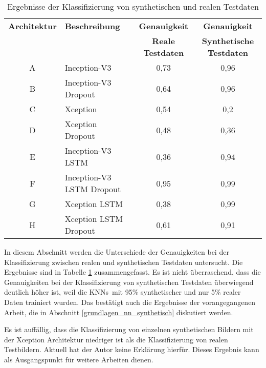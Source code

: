 \begin{table}[h]
\small
\centering
\def\arraystretch{1.4}
\begin{tabular}{c p{3cm} c c}
\textbf{Architektur} & \textbf{Beschreibung} & \textbf{Genauigkeit} & \textbf{Genauigkeit} \\
 & & \textbf{Reale Testdaten} & \textbf{Synthetische Testdaten} \\
\hline
A & Inception-V3 & 0,73 & 0,96 \\
\hline
B & Inception-V3 \newline Dropout & 0,64 & 0,96 \\
\hline
C & Xception & 0,54 & 0,2 \\
\hline
D & Xception \newline Dropout & 0,48 & 0,36 \\
\hline 
E & Inception-V3 \newline LSTM & 0,36 & 0,94 \\
\hline
F & Inception-V3 \newline LSTM \newline Dropout & 0,95 & 0,99 \\
\hline
G & Xception \newline LSTM & 0,38 & 0,99 \\
\hline
H & Xception \newline LSTM \newline Dropout & 0,61 & 0,91 \\
\hline
\end{tabular}
\caption{Ergebnisse der Klassifizierung von synthetischen und realen Testdaten}
\label{tab_ergebnis_synth}
\end{table}

In diesem Abschnitt werden die Unterschiede der Genauigkeiten bei der Klassifizierung zwischen realen und synthetischen Testdaten untersucht. Die Ergebnisse sind in Tabelle \ref{tab_ergebnis_synth} zusammengefasst. Es ist nicht überraschend, dass die Genauigkeiten bei der Klassifizierung von synthetischen Testdaten überwiegend deutlich höher ist, weil die \acp{KNN} mit 95\% synthetischer und nur 5\% realer Daten trainiert wurden. Das bestätigt auch die Ergebnisse der vorangegangenen Arbeit, die in Abschnitt \ref{grundlagen_nn_synthetisch} diskutiert werden. 

Es ist auffällig, dass die Klassifizierung von einzelnen synthetischen Bildern mit der Xception Architektur niedriger ist als die Klassifizierung von realen Testbildern. Aktuell hat der Autor keine Erklärung hierfür. Dieses Ergebnis kann als Ausgangspunkt für weitere Arbeiten dienen.


